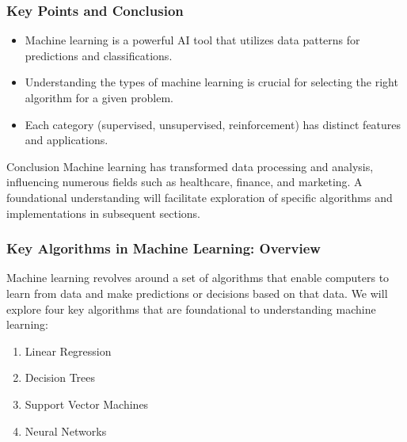 \documentclass{beamer}
\begin{document}
\begin{frame}[fragile]
    \frametitle{Key Points and Conclusion}
    \begin{itemize}
        \item Machine learning is a powerful AI tool that utilizes data patterns for predictions and classifications.
        \item Understanding the types of machine learning is crucial for selecting the right algorithm for a given problem.
        \item Each category (supervised, unsupervised, reinforcement) has distinct features and applications.
    \end{itemize}

    \begin{block}{Conclusion}
        Machine learning has transformed data processing and analysis, influencing numerous fields such as healthcare, finance, and marketing. 
        A foundational understanding will facilitate exploration of specific algorithms and implementations in subsequent sections.
    \end{block}
\end{frame}

\begin{frame}[fragile]
    \frametitle{Key Algorithms in Machine Learning: Overview}
    Machine learning revolves around a set of algorithms that enable computers to learn from data and make predictions or decisions based on that data. We will explore four key algorithms that are foundational to understanding machine learning:

    \begin{enumerate}
        \item Linear Regression
        \item Decision Trees
        \item Support Vector Machines
        \item Neural Networks
    \end{enumerate}
\end{frame}
\end{document}
